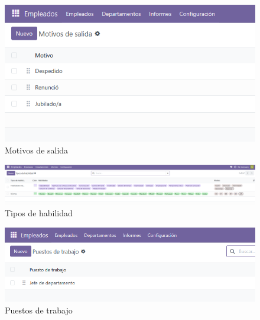 \documentclass[a4paper,12pt]{article}
\begin{document}
\begin{figure}[h!]
    \centering
    \includegraphics[width=1\textwidth]{pr2odoo23-motivosSalida.png}
    \caption{Motivos de salida}
\end{figure}
\FloatBarrier

\begin{figure}[h!]
    \centering
    \includegraphics[width=1\textwidth]{pr2odoo24-tiposHabilidad.png}
    \caption{Tipos de habilidad}
\end{figure}
\FloatBarrier

\begin{figure}[h!]
    \centering
    \includegraphics[width=1\textwidth]{pr2odoo25-puestosTrabajo.png}
    \caption{Puestos de trabajo}
\end{figure}
\FloatBarrier
\end{document}
